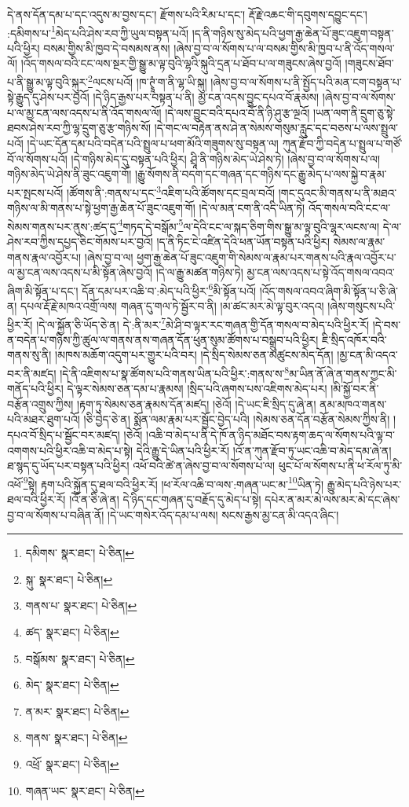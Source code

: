 དེ་ནས་དོན་དམ་པ་དང་འདུས་མ་བྱས་དང་། རྫོགས་པའི་རིམ་པ་དང་། རྡོ་རྗེ་འཆང་གི་དབུགས་དབྱུང་དང་། :དམིགས་པ་\footnote{དམིགས་  སྣར་ཐང་།  པེ་ཅིན། }མེད་པའི་ཤེས་རབ་ཀྱི་ཡུལ་བསྟན་པའོ། །ད་ནི་གཉིས་སུ་མེད་པའི་ཕྱག་རྒྱ་ཆེན་པོ་ཟུང་འཇུག་བསྟན་པའི་ཕྱིར། བསམ་གྱིས་མི་ཁྱབ་དེ་བསམས་ནས། །ཞེས་བྱ་བ་ལ་སོགས་པ་ལ་བསམ་གྱིས་མི་ཁྱབ་པ་ནི་འོད་གསལ་ལོ། །འོད་གསལ་བའི་ངང་ལས་སྔར་གྱི་སྒྱུ་མ་ལྟ་བུའི་ལྷའི་སྐུའི་དྲན་པ་ཐོབ་པ་ལ་གཟུངས་ཞེས་བྱའོ། །གཟུངས་ཐོབ་པ་ནི་སྒྱུ་མ་ལྟ་བུའི་སྐུར་\footnote{སྐུ་  སྣར་ཐང་།  པེ་ཅིན། }ལངས་པའོ། །ཁ་ཊྭཱཾ་ག་ནི་ལྷ་ཡི་སྐུ། །ཞེས་བྱ་བ་ལ་སོགས་པ་ནི་སྤྱོད་པའི་མན་ངག་བསྟན་པ་སྟེ་རྒྱུད་དུ་ཤེས་པར་བྱའོ། །དེ་ཉིད་རྒྱས་པར་བསྟན་པ་ནི། མྱ་ངན་འདས་བྱུང་དཔའ་བོ་རྣམས། །ཞེས་བྱ་བ་ལ་སོགས་པ་ལ་མྱ་ངན་ལས་འདས་པ་ནི་འོད་གསལ་ལོ། །དེ་ལས་བྱུང་བའི་དཔའ་བོ་ནི་ཉི་ཤུ་རྩ་ལྔའོ། །ཡན་ལག་ནི་དྲུག་ཅུ་སྟེ་ཐབས་ཤེས་རབ་ཀྱི་ལྷ་དྲུག་ཅུ་རྩ་གཉིས་སོ། །དེ་གང་ལ་བརྟེན་ནས་ཤེ་ན་སེམས་གསུམ་རླུང་དང་བཅས་པ་ལས་སྤྲུལ་པའོ། །དེ་ཡང་དོན་དམ་པའི་བདེན་པའི་སྤྲུལ་པ་ཕག་མོའི་གཟུགས་སུ་བསྟན་ལ། ཀུན་རྫོབ་ཀྱི་བདེན་པ་སྤྲུལ་པ་གཙོ་བོ་ལ་སོགས་པའོ། །དེ་གཉིས་མེད་དུ་བསྟན་པའི་ཕྱིར། ཤྲཱི་ནི་གཉིས་མེད་ཡེ་ཤེས་ཏེ། །ཞེས་བྱ་བ་ལ་སོགས་པ་ལ། གཉིས་མེད་ཡེ་ཤེས་ནི་ཟུང་འཇུག་གོ། །རྒྱུ་སོགས་ནི་བདག་དང་གཞན་དང་གཉིས་དང་རྒྱུ་མེད་པ་ལས་སྐྱེ་བ་རྣམ་པར་སྤངས་པའོ། །ཚོགས་ནི་:གནས་པ་དང་\footnote{གནས་པ་  སྣར་ཐང་།  པེ་ཅིན། }འཇིག་པའི་ཚོགས་དང་བྲལ་བའོ། །གང་དུའང་མི་གནས་པ་ནི་མཐའ་གཉིས་ལ་མི་གནས་པ་སྟེ་ཕྱག་རྒྱ་ཆེན་པོ་ཟུང་འཇུག་གོ། །དེ་ལ་མན་ངག་ནི་འདི་ཡིན་ཏེ། འོད་གསལ་བའི་ངང་ལ་སེམས་གནས་པར་ནུས་:ཚད་དུ་\footnote{ཚད་  སྣར་ཐང་།  པེ་ཅིན། }གཏད་དེ་བསྒོམ་\footnote{བསྒོམས་  སྣར་ཐང་།  པེ་ཅིན། }ལ་དེའི་ངང་ལ་སྐད་ཅིག་གིས་སྒྱུ་མ་ལྟ་བུའི་ལྷར་ལངས་ལ། དེ་ལ་ཤེས་རབ་ཀྱིས་དཔྱད་ཅིང་གོམས་པར་བྱའོ། །ད་ནི་ཏིང་ངེ་འཛིན་དེའི་ཕན་ཡོན་བསྟན་པའི་ཕྱིར། སེམས་ལ་རྣམ་གནས་རྣལ་འབྱོར་པ། །ཞེས་བྱ་བ་ལ། ཕྱག་རྒྱ་ཆེན་པོ་ཟུང་འཇུག་གི་སེམས་ལ་རྣམ་པར་གནས་པའི་རྣལ་འབྱོར་པ་ལ་མྱ་ངན་ལས་འདས་པ་མི་སྟོན་ཞེས་བྱའོ། །དེ་ལ་རྒྱུ་མཚན་གཉིས་ཏེ། མྱ་ངན་ལས་འདས་པ་སྟེ་འོད་གསལ་འབའ་ཞིག་མི་སྟོན་པ་དང་། དོན་དམ་པར་འཆི་བ་:མེད་པའི་ཕྱིར་\footnote{མེད་  སྣར་ཐང་།  པེ་ཅིན། }མི་སྟོན་པའོ། །འོད་གསལ་འབའ་ཞིག་མི་སྟོན་པ་ཅི་ཞེ་ན། དཔལ་རྡོ་རྗེ་མཁའ་འགྲོ་ལས། གཞན་དུ་གལ་ཏེ་སྦྱོར་བ་ནི། །མ་ཚང་མར་མེ་ལྟ་བུར་འདའ། །ཞེས་གསུངས་པའི་ཕྱིར་རོ། །དེ་ལ་སྐྱོན་ཅི་ཡོད་ཅེ་ན། དེ་:ནི་མར་\footnote{ན་མར་  སྣར་ཐང་།  པེ་ཅིན། }མེ་ཤི་བ་ལྟར་རང་གཞན་གྱི་དོན་གསལ་བ་མེད་པའི་ཕྱིར་རོ། །དེ་བས་ན་བདེན་པ་གཉིས་ཀྱི་ཚུལ་ལ་གནས་ནས་གཞན་དོན་ཕུན་སུམ་ཚོགས་པ་བསྒྲུབ་པའི་ཕྱིར། ཇི་སྲིད་འཁོར་བའི་གནས་སུ་ནི། །མཁས་མཆོག་འདུག་པར་གྱུར་པའི་བར། །དེ་སྲིད་སེམས་ཅན་མཚུངས་མེད་དོན། །མྱ་ངན་མི་འདའ་བར་ནི་མཛད། །དེ་ནི་འཇིགས་པ་སྣ་ཚོགས་པའི་གནས་ཡིན་པའི་ཕྱིར་:གནས་ས་\footnote{གནས་  སྣར་ཐང་།  པེ་ཅིན། }མ་ཡིན་ནོ་ཞེ་ན་གནས་ཀྱང་མི་གནོད་པའི་ཕྱིར། དེ་ལྟར་སེམས་ཅན་དམ་པ་རྣམས། །སྲིད་པའི་ཞགས་པས་འཇིགས་མེད་པར། །མི་སྐྱོ་བར་ནི་བརྩོན་འགྲུས་ཀྱིས། །རྟག་ཏུ་སེམས་ཅན་རྣམས་དོན་མཛད། །ཅེའོ། །དེ་ཡང་ཇི་སྲིད་དུ་ཞེ་ན། ནམ་མཁའ་གནས་པའི་མཐར་ཐུག་པའོ། །ཅི་བྱེད་ཅེ་ན། སྨོན་ལམ་རྣམ་པར་སྦྱོང་བྱེད་པའི། །སེམས་ཅན་དོན་བརྩོན་སེམས་ཀྱིས་ནི། །དཔའ་བོ་སྲིད་པ་སྦྱོང་བར་མཛད། །ཅེའོ། །འཆི་བ་མེད་པ་ནི་དེ་ཁོ་ན་ཉིད་མཐོང་བས་རྟག་ཆད་ལ་སོགས་པའི་ལྟ་བ་འགགས་པའི་ཕྱིར་འཆི་བ་མེད་པ་སྟེ། དེའི་རྒྱུ་དེ་ཡིན་པའི་ཕྱིར་རོ། །འོ་ན་ཀུན་རྫོབ་ཏུ་ཡང་འཆི་བ་མེད་དམ་ཞེ་ན། ཐ་སྙད་དུ་ཡོད་པར་བསྟན་པའི་ཕྱིར། འཕོ་བའི་ཚེ་ན་ཞེས་བྱ་བ་ལ་སོགས་པ་ལ། ཕུང་པོ་ལ་སོགས་པ་ནི་ཕ་རོལ་ཏུ་མི་འཕོ་\footnote{འཕྲོ་  སྣར་ཐང་།  པེ་ཅིན། }སྟེ། རྟག་པའི་སྐྱོན་དུ་ཐལ་བའི་ཕྱིར་རོ། །ཕ་རོལ་འཆི་བ་ལས་:གཞན་ཡང་མ་\footnote{གཞན་ཡང་  སྣར་ཐང་།  པེ་ཅིན། }ཡིན་ཏེ། རྒྱུ་མེད་པའི་ཉེས་པར་ཐལ་བའི་ཕྱིར་རོ། །འོ་ན་ཅི་ཞེ་ན། དེ་ཉིད་དང་གཞན་དུ་བརྗོད་དུ་མེད་པ་སྟེ། དཔེར་ན་མར་མེ་ལས་མར་མེ་དང་ཞེས་བྱ་བ་ལ་སོགས་པ་བཞིན་ནོ། །དེ་ཡང་གསེར་འོད་དམ་པ་ལས། སངས་རྒྱས་མྱ་ངན་མི་འདའ་ཞིང་། 